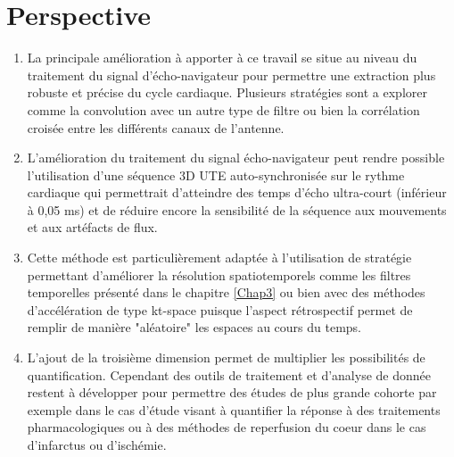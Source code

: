 \section{Perspective}
\begin{enumerate}

\item La principale amélioration à apporter à ce travail se situe au niveau du traitement du signal d'écho-navigateur pour permettre une extraction plus robuste et précise du cycle cardiaque. Plusieurs stratégies sont a explorer comme la convolution avec un autre type de filtre ou bien la corrélation croisée entre les différents canaux de l'antenne.

\item L'amélioration du traitement du signal écho-navigateur peut rendre possible l'utilisation d'une séquence 3D UTE auto-synchronisée sur le rythme cardiaque qui permettrait d'atteindre des temps d'écho ultra-court (inférieur à 0,05 ms) et de réduire encore la sensibilité de la séquence aux mouvements et aux artéfacts de flux.

\item Cette méthode est particulièrement adaptée à l'utilisation de stratégie permettant d'améliorer la résolution spatiotemporels comme les filtres temporelles présenté dans le chapitre \ref{Chap3} ou bien avec des méthodes d'accélération de type kt-space puisque l'aspect rétrospectif permet de remplir de manière "aléatoire" les espaces au cours du temps.

\item L'ajout de la troisième dimension permet de multiplier les possibilités de quantification. Cependant des outils de traitement et d'analyse de donnée restent à développer pour permettre des études de plus grande cohorte par exemple dans le cas d'étude visant à quantifier la réponse à des traitements pharmacologiques ou à des méthodes de reperfusion du coeur dans le cas d'infarctus ou d'ischémie.
\end{enumerate}
